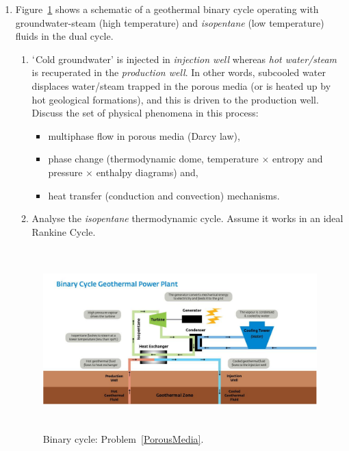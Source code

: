 \documentclass[12pts,a4paper,amsmath,amssymb,floatfix]{article}%
\begin{document}
\begin{enumerate}[label=\bfseries Problem \arabic*:]

\item\label{PorousMedia} Figure~\ref{Fig:Binary} shows a schematic of a geothermal binary cycle operating with groundwater-steam (high temperature) and {\it isopentane} (low temperature) fluids in the dual cycle. 
\begin{enumerate}
\item $\lq$Cold groundwater' is injected in {\it injection well} whereas {\it hot water/steam} is recuperated in the {\it production well}. In other words, subcooled water displaces water/steam trapped in the porous media (or is heated up by hot geological formations), and this is driven to the production well. Discuss the set of physical phenomena in this process: 
\begin{itemize}
\item multiphase flow in porous media (Darcy law), 
\item phase change (thermodynamic dome, temperature $\times$ entropy and pressure $\times$ enthalpy diagrams) and,
\item heat transfer (conduction and convection) mechanisms.
\end{itemize}
\item Analyse the {\it isopentane} thermodynamic cycle. Assume it works in an ideal Rankine Cycle.
\end{enumerate}

\begin{figure}[h]
\begin{center}
  \includegraphics[width=12.0cm,height=7.0cm]{./Pics/BinaryCycle} 
\end{center}
\caption{Binary cycle: Problem~\ref{PorousMedia}.}\label{Fig:Binary}
\end{figure}


\end{enumerate}
\end{document}
